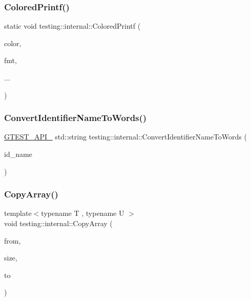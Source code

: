 \mbox{\label{namespacetesting_1_1internal_a1d9493ff218e622051c53094eb54bcd6}} 
\subsubsection{\texorpdfstring{ColoredPrintf()}{ColoredPrintf()}}
{\footnotesize\ttfamily static void testing\+::internal\+::\+Colored\+Printf (\begin{DoxyParamCaption}\item[{\mbox{\hyperlink{namespacetesting_1_1internal_a648c1bc94c2ef9e868ff3f9dff0f9c4e}{G\+Test\+Color}}}]{color,  }\item[{const char $\ast$}]{fmt,  }\item[{}]{... }\end{DoxyParamCaption})}

\mbox{\label{namespacetesting_1_1internal_a0b375abcf3081393e6c420194a541b29}} 
\subsubsection{\texorpdfstring{ConvertIdentifierNameToWords()}{ConvertIdentifierNameToWords()}}
{\footnotesize\ttfamily \mbox{\hyperlink{_obj__test_2lib_2googletest-release-1_88_81_2googletest_2include_2gtest_2internal_2gtest-port_8h_aa73be6f0ba4a7456180a94904ce17790}{G\+T\+E\+S\+T\+\_\+\+A\+P\+I\+\_\+}} std\+::string testing\+::internal\+::\+Convert\+Identifier\+Name\+To\+Words (\begin{DoxyParamCaption}\item[{const char $\ast$}]{id\+\_\+name }\end{DoxyParamCaption})}

\mbox{\label{namespacetesting_1_1internal_afb1b9728aaaf6d9fe6246a19cfe3f7f5}} 
\subsubsection{\texorpdfstring{CopyArray()}{CopyArray()}\hspace{0.1cm}{\footnotesize\ttfamily [1/3]}}
{\footnotesize\ttfamily template$<$typename T , typename U $>$ \\
void testing\+::internal\+::\+Copy\+Array (\begin{DoxyParamCaption}\item[{const T $\ast$}]{from,  }\item[{size\+\_\+t}]{size,  }\item[{U $\ast$}]{to }\end{DoxyParamCaption})}

